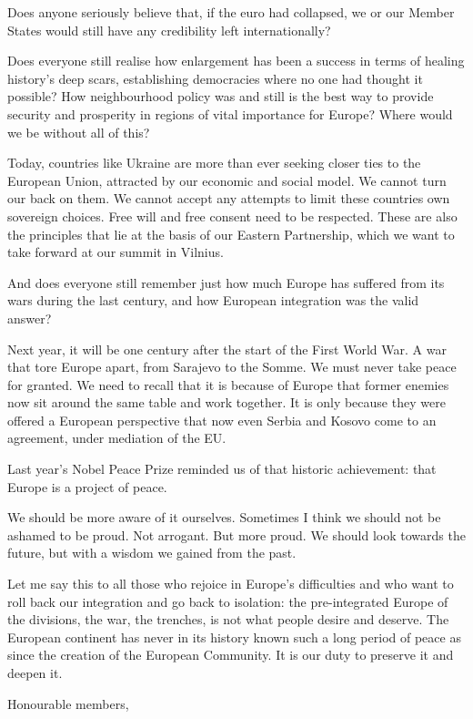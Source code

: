 \documentclass[a4paper,11pt]{article}
\begin{document}
Does anyone seriously believe that, if the euro had collapsed, we or our Member States would still have any credibility left internationally?

Does everyone still realise how enlargement has been a success in terms of healing history's deep scars, establishing democracies where no one had thought it possible? How neighbourhood policy was and still is the best way to provide security and prosperity in regions of vital importance for Europe? Where would we be without all of this?

Today, countries like Ukraine are more than ever seeking closer ties to the European Union, attracted by our economic and social model. We cannot turn our back on them. We cannot accept any attempts to limit these countries own sovereign choices. Free will and free consent need to be respected. These are also the principles that lie at the basis of our Eastern Partnership, which we want to take forward at our summit in Vilnius.

And does everyone still remember just how much Europe has suffered from its wars during the last century, and how European integration was the valid answer?

Next year, it will be one century after the start of the First World War. A war that tore Europe apart, from Sarajevo to the Somme. We must never take peace for granted. We need to recall that it is because of Europe that former enemies now sit around the same table and work together. It is only because they were offered a European perspective that now even Serbia and Kosovo come to an agreement, under mediation of the EU.

Last year's Nobel Peace Prize reminded us of that historic achievement: that Europe is a project of peace.

We should be more aware of it ourselves. Sometimes I think we should not be ashamed to be proud. Not arrogant. But more proud. We should look towards the future, but with a wisdom we gained from the past.

Let me say this to all those who rejoice in Europe's difficulties and who want to roll back our integration and go back to isolation: the pre-integrated Europe of the divisions, the war, the trenches, is not what people desire and deserve. The European continent has never in its history known such a long period of peace as since the creation of the European Community. It is our duty to preserve it and deepen it.

Honourable members,
\end{document}
